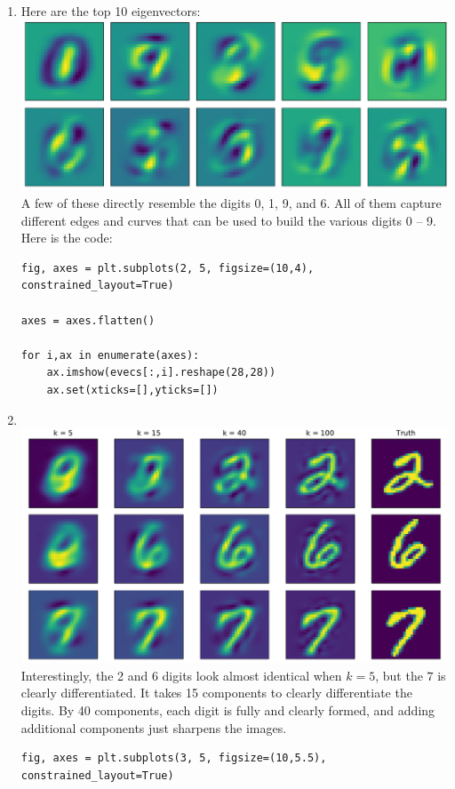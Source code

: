 \documentclass{article}
\begin{document}
\begin{enumerate}
        \newpage
        \item Here are the top 10 eigenvectors: \\
        \includegraphics[width=\textwidth]{code/A7d.pdf} \\
        A few of these directly resemble the digits 0, 1, 9, and 6.
        All of them capture different edges and curves that can be used to build the various digits 0 -- 9. \\
        Here is the code:
        \begin{verbatim}
fig, axes = plt.subplots(2, 5, figsize=(10,4), constrained_layout=True)

axes = axes.flatten()

for i,ax in enumerate(axes):
    ax.imshow(evecs[:,i].reshape(28,28))
    ax.set(xticks=[],yticks=[])
        \end{verbatim}

        \item \, \\
        \includegraphics[width=\textwidth]{code/A7e.pdf} \\
        Interestingly, the 2 and 6 digits look almost identical when $k=5$, but the $7$ is clearly differentiated.
        It takes 15 components to clearly differentiate the digits.
        By 40 components, each digit is fully and clearly formed, and adding additional components just sharpens the images.
        \begin{verbatim}
fig, axes = plt.subplots(3, 5, figsize=(10,5.5), constrained_layout=True)


\end{verbatim}
\end{enumerate}
\end{document}
